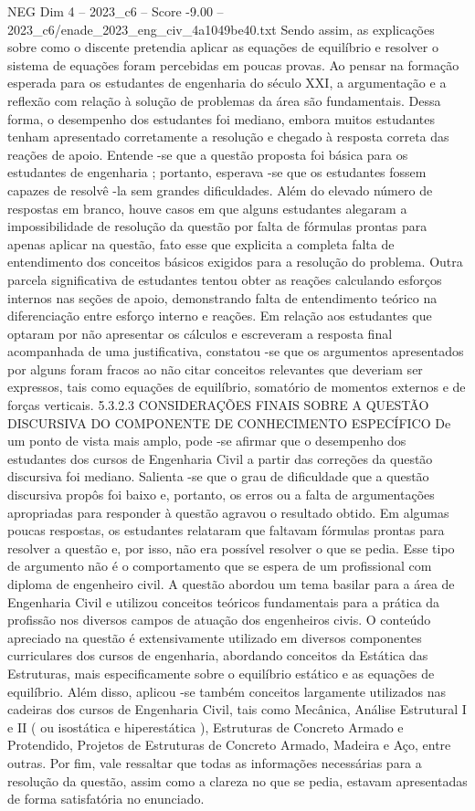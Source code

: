 \begin{textsample}{NEG Dim 4 – 2023\_c6 – Score -9.00 – 2023\_c6/enade\_2023\_eng\_civ\_4a1049be40.txt}
Sendo assim, as explicações sobre como o discente pretendia aplicar as equações de equilíbrio e resolver o sistema de equações foram percebidas em poucas provas.
Ao pensar na formação esperada para os estudantes de engenharia do século XXI, a argumentação e a reflexão com relação à solução de problemas da área são fundamentais.
Dessa forma, o desempenho dos estudantes foi mediano, embora muitos estudantes tenham apresentado corretamente a resolução e chegado à resposta correta das reações de apoio.
Entende -se que a questão proposta foi básica para os estudantes de engenharia ; portanto, esperava -se que os estudantes fossem capazes de resolvê -la sem grandes dificuldades.
Além do elevado número de respostas em branco, houve casos em que alguns estudantes alegaram a impossibilidade de resolução da questão por falta de fórmulas prontas para apenas aplicar na questão, fato esse que explicita a completa falta de entendimento dos conceitos básicos exigidos para a resolução do problema.
Outra parcela significativa de estudantes tentou obter as reações calculando esforços internos nas seções de apoio, demonstrando falta de entendimento teórico na diferenciação entre esforço interno e reações.
Em relação aos estudantes que optaram por não apresentar os cálculos e escreveram a resposta final acompanhada de uma justificativa, constatou -se que os argumentos apresentados por alguns foram fracos ao não citar conceitos relevantes que deveriam ser expressos, tais como equações de equilíbrio, somatório de momentos externos e de forças verticais. 5.3.2.3 CONSIDERAÇÕES FINAIS SOBRE A QUESTÃO DISCURSIVA DO COMPONENTE DE CONHECIMENTO ESPECÍFICO De um ponto de vista mais amplo, pode -se afirmar que o desempenho dos estudantes dos cursos de Engenharia Civil a partir das correções da questão discursiva foi mediano.
Salienta -se que o grau de dificuldade que a questão discursiva propôs foi baixo e, portanto, os erros ou a falta de argumentações apropriadas para responder à questão agravou o resultado obtido.
Em algumas poucas respostas, os estudantes relataram que faltavam fórmulas prontas para resolver a questão e, por isso, não era possível resolver o que se pedia.
Esse tipo de argumento não é o comportamento que se espera de um profissional com diploma de engenheiro civil.
A questão abordou um tema basilar para a área de Engenharia Civil e utilizou conceitos teóricos fundamentais para a prática da profissão nos diversos campos de atuação dos engenheiros civis.
O conteúdo apreciado na questão é extensivamente utilizado em diversos componentes curriculares dos cursos de engenharia, abordando conceitos da Estática das Estruturas, mais especificamente sobre o equilíbrio estático e as equações de equilíbrio.
Além disso, aplicou -se também conceitos largamente utilizados nas cadeiras dos cursos de Engenharia Civil, tais como Mecânica, Análise Estrutural I e II ( ou isostática e hiperestática ), Estruturas de Concreto Armado e Protendido, Projetos de Estruturas de Concreto Armado, Madeira e Aço, entre outras.
Por fim, vale ressaltar que todas as informações necessárias para a resolução da questão, assim como a clareza no que se pedia, estavam apresentadas de forma satisfatória no enunciado.


\end{textsample}
